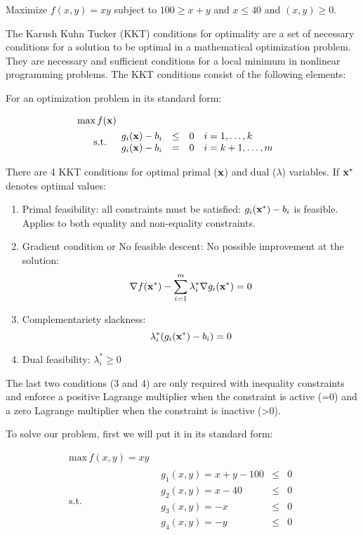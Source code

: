 \Exercise Maximize $f(x,y)=xy$ subject to $100 \geq x+y$ and $x\leq 40$ and $(x,y)\geq0$.

\Answer 

The Karush Kuhn Tucker (KKT) conditions  for optimality are a set of necessary conditions for a solution to be optimal in a mathematical optimization problem. They are necessary and sufficient conditions for a local minimum in nonlinear programming problems. The KKT conditions consist of the following elements:

For an optimization problem in its standard form:

\begin{equation*}
  \begin{aligned}
    \text{max} \, f(\textbf{x}) \\
    \text{s.t.}\quad &
    \begin{array}{rcl}
      g_i(\textbf{x})-b_i  & \leq & 0 \quad i=1,\ldots,k \\
      g_i(\textbf{x})-b_i  & = & 0 \quad i=k+1,\ldots,m \\
    \end{array}
  \end{aligned}
\end{equation*}

There are 4 KKT conditions for optimal primal ($\textbf{x}$) and dual ($\lambda$) variables. If $\textbf{x}^*$ denotes optimal values:
\begin{enumerate}
  \item Primal feasibility: all constraints must be satisfied: $g_i(\textbf{x}^*)-b_i$ is feasible. Applies to both equality and non-equality constraints.
  \item Gradient condition or No feasible descent: No possible improvement at the solution: 
  \[ \nabla f(\textbf{x}^*)-\sum_{i=1}^m \lambda_i^* \nabla g_i (\textbf{x}^*)=0\]
  \item Complementariety slackness: 
  \[\lambda_i^* (g_i(\textbf{x}^*)-b_i)=0\]
  \item Dual feasibility: $\lambda_i^*\geq 0$
\end{enumerate}

The last two conditions (3 and 4) are only required with inequality constraints and enforce a positive Lagrange multiplier when the constraint is active (=0) and a zero Lagrange multiplier when the constraint is inactive (>0). 

To solve our problem, first we will put it in its standard form:


\begin{equation*}
  \begin{aligned}
    \text{max} \, f(x,y)=xy \\
    \text{s.t.}\quad &
    \begin{array}{rcl}
      g_1(x,y)=x+y-100  & \leq & 0  \\
      g_2(x,y)=x-40 & \leq & 0  \\
      g_3(x,y)=-x&\leq&0\\
      g_4(x,y)=-y&\leq&0\\
    \end{array}
  \end{aligned}
\end{equation*}


